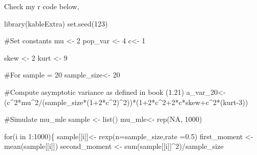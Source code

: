 \documentclass[
  letterpaper,
  DIV=11,
  numbers=noendperiod]{scrreprt}
\newenvironment{Shaded}{\begin{snugshade}}{\end{snugshade}}
\newcommand{\AttributeTok}[1]{\textcolor[rgb]{0.40,0.45,0.13}{#1}}
\newcommand{\CommentTok}[1]{\textcolor[rgb]{0.37,0.37,0.37}{#1}}
\newcommand{\ConstantTok}[1]{\textcolor[rgb]{0.56,0.35,0.01}{#1}}
\newcommand{\ControlFlowTok}[1]{\textcolor[rgb]{0.00,0.23,0.31}{#1}}
\newcommand{\DecValTok}[1]{\textcolor[rgb]{0.68,0.00,0.00}{#1}}
\newcommand{\FloatTok}[1]{\textcolor[rgb]{0.68,0.00,0.00}{#1}}
\newcommand{\FunctionTok}[1]{\textcolor[rgb]{0.28,0.35,0.67}{#1}}
\newcommand{\NormalTok}[1]{\textcolor[rgb]{0.00,0.23,0.31}{#1}}
\newcommand{\OtherTok}[1]{\textcolor[rgb]{0.00,0.23,0.31}{#1}}
\newcommand{\SpecialCharTok}[1]{\textcolor[rgb]{0.37,0.37,0.37}{#1}}
\begin{document}
Check my r code below,

\begin{Shaded}
\begin{Highlighting}[]
\FunctionTok{library}\NormalTok{(kableExtra)}
\FunctionTok{set.seed}\NormalTok{(}\DecValTok{123}\NormalTok{)}

\CommentTok{\#Set constants}
\NormalTok{mu }\OtherTok{\textless{}{-}} \DecValTok{2}
\NormalTok{pop\_var }\OtherTok{\textless{}{-}} \DecValTok{4}
\NormalTok{c}\OtherTok{\textless{}{-}} \DecValTok{1}


\NormalTok{skew }\OtherTok{\textless{}{-}} \DecValTok{2}
\NormalTok{kurt }\OtherTok{\textless{}{-}} \DecValTok{9}


\CommentTok{\#For sample = 20}
\NormalTok{sample\_size}\OtherTok{\textless{}{-}} \DecValTok{20}

\CommentTok{\#Compute asymptotic variance as defined in book (1.21)}
\NormalTok{a\_var\_20}\OtherTok{\textless{}{-}}\NormalTok{ (c}\SpecialCharTok{\^{}}\DecValTok{2}\SpecialCharTok{*}\NormalTok{mu}\SpecialCharTok{\^{}}\DecValTok{2}\SpecialCharTok{/}\NormalTok{(sample\_size}\SpecialCharTok{*}\NormalTok{(}\DecValTok{1}\SpecialCharTok{+}\DecValTok{2}\SpecialCharTok{*}\NormalTok{c}\SpecialCharTok{\^{}}\DecValTok{2}\NormalTok{)}\SpecialCharTok{\^{}}\DecValTok{2}\NormalTok{))}\SpecialCharTok{*}\NormalTok{(}\DecValTok{1}\SpecialCharTok{+}\DecValTok{2}\SpecialCharTok{*}\NormalTok{c}\SpecialCharTok{\^{}}\DecValTok{2}\SpecialCharTok{+}\DecValTok{2}\SpecialCharTok{*}\NormalTok{c}\SpecialCharTok{*}\NormalTok{skew}\SpecialCharTok{+}\NormalTok{c}\SpecialCharTok{\^{}}\DecValTok{2}\SpecialCharTok{*}\NormalTok{(kurt}\DecValTok{{-}3}\NormalTok{))}

\CommentTok{\#Simulate mu\_mle}
\NormalTok{sample }\OtherTok{\textless{}{-}} \FunctionTok{list}\NormalTok{()}
\NormalTok{mu\_mle}\OtherTok{\textless{}{-}} \FunctionTok{rep}\NormalTok{(}\ConstantTok{NA}\NormalTok{, }\DecValTok{1000}\NormalTok{)}

\ControlFlowTok{for}\NormalTok{(i }\ControlFlowTok{in} \DecValTok{1}\SpecialCharTok{:}\DecValTok{1000}\NormalTok{)\{}
\NormalTok{    sample[[i]]}\OtherTok{\textless{}{-}} \FunctionTok{rexp}\NormalTok{(}\AttributeTok{n=}\NormalTok{sample\_size,}\AttributeTok{rate =}\FloatTok{0.5}\NormalTok{)}
\NormalTok{    first\_moment }\OtherTok{\textless{}{-}} \FunctionTok{mean}\NormalTok{(sample[[i]])}
\NormalTok{    second\_moment }\OtherTok{\textless{}{-}} \FunctionTok{sum}\NormalTok{(sample[[i]]}\SpecialCharTok{\^{}}\DecValTok{2}\NormalTok{)}\SpecialCharTok{/}\NormalTok{sample\_size}
    

\end{Highlighting}
\end{Shaded}
\end{document}
